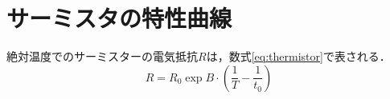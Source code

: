 \documentclass[a4paper,11pt]{ltjsarticle}
\begin{document}
\section{サーミスタの特性曲線}
絶対温度でのサーミスターの電気抵抗$R$は，数式\eqref{eq:thermistor}で表される．
\begin{equation}
    R = R_0 \exp B \cdot \left( \frac{1}{T} - \frac{1}{t_0} \right)
    \label{eq:thermistor}
\end{equation}
\end{document}
